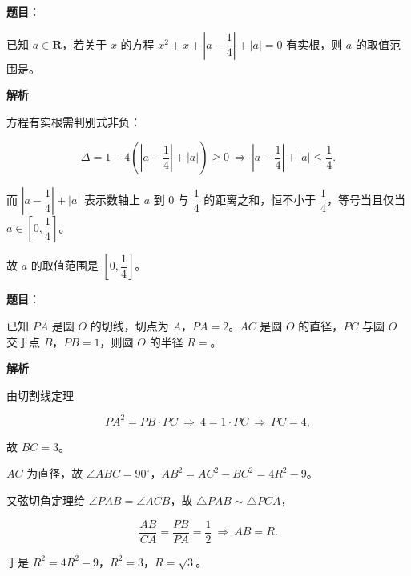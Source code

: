 \begin{answer}

\textbf{题目}：

已知 $a\in\mathbf R$，若关于 $x$ 的方程 $x^2+x+\left|a-\dfrac14\right|+|a|=0$ 有实根，则 $a$ 的取值范围是\gkblank{}。

\textbf{解析}

方程有实根需判别式非负：

\nopagebreak[4]
\[\Delta=1-4\left(\left|a-\frac14\right|+|a|\right)\geqslant0\ \Longrightarrow\ \left|a-\frac14\right|+|a|\leqslant\frac14.\]

而 $\left|a-\dfrac14\right|+|a|$ 表示数轴上 $a$ 到 $0$ 与 $\dfrac14$ 的距离之和，恒不小于 $\dfrac14$，等号当且仅当 $a\in\left[0,\dfrac14\right]$。

故 $a$ 的取值范围是 $\left[0,\dfrac14\right]$。


\end{answer}
\begin{answer}

\textbf{题目}：

已知 $PA$ 是圆 $O$ 的切线，切点为 $A$，$PA=2$。$AC$ 是圆 $O$ 的直径，$PC$ 与圆 $O$ 交于点 $B$，$PB=1$，则圆 $O$ 的半径 $R=$\gkblank{}。

\textbf{解析}

由切割线定理

\nopagebreak[4]
\[PA^2=PB\cdot PC\ \Longrightarrow\ 4=1\cdot PC\ \Longrightarrow\ PC=4,\]

故 $BC=3$。

$AC$ 为直径，故 $\angle ABC=90^\circ$，$AB^2=AC^2-BC^2=4R^2-9$。

又弦切角定理给 $\angle PAB=\angle ACB$，故 $\triangle PAB\sim\triangle PCA$，

\nopagebreak[4]
\[\frac{AB}{CA}=\frac{PB}{PA}=\frac12\ \Longrightarrow\ AB=R.\]

于是 $R^2=4R^2-9$，$R^2=3$，$R=\sqrt3$。


\end{answer}
